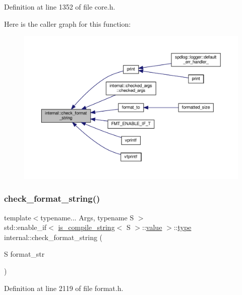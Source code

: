 Definition at line 1352 of file core.\+h.

Here is the caller graph for this function\+:
\nopagebreak
\begin{figure}[H]
\begin{center}
\leavevmode
\includegraphics[width=350pt]{namespaceinternal_a14d62818b14fe8556fdb1718e12fd1ab_icgraph}
\end{center}
\end{figure}
\mbox{\label{namespaceinternal_a6184fcc754b94046ef76495b8b105024}} 
\subsubsection{\texorpdfstring{check\+\_\+format\+\_\+string()}{check\_format\_string()}\hspace{0.1cm}{\footnotesize\ttfamily [2/2]}}
{\footnotesize\ttfamily template$<$typename... Args, typename S $>$ \\
std\+::enable\+\_\+if$<$ \hyperlink{structis__compile__string}{is\+\_\+compile\+\_\+string}$<$ S $>$\+::\hyperlink{classinternal_1_1value}{value} $>$\+::\hyperlink{namespaceinternal_a8661864098ac0acff9a6dd7e66f59038}{type} internal\+::check\+\_\+format\+\_\+string (\begin{DoxyParamCaption}\item[{S}]{format\+\_\+str }\end{DoxyParamCaption})}



Definition at line 2119 of file format.\+h.

